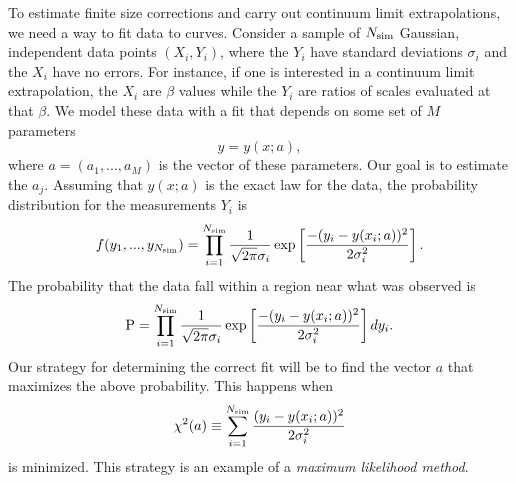To estimate finite size corrections and carry out continuum limit
extrapolations, we need a way to fit data to curves.
Consider a sample of $N_{\text{sim}}$ Gaussian, independent data points $(X_i,Y_i)$,
where the $Y_i$ have standard deviations $\sigma_i$ and the $X_i$ have
no errors. For instance, if one is interested in a continuum limit
extrapolation, the $X_i$ are $\beta$ values while the $Y_i$ are
ratios of scales evaluated at that $\beta$.
We model these data with a fit that depends on some set
of $M$ parameters
\begin{equation}
  y=y(x;a),
\end{equation}
where $a=(a_1,...,a_M)$ is the vector of these parameters. Our goal
is to estimate the $a_j$.
Assuming that $y(x;a)$ is the exact law for the data, the probability
distribution for the measurements $Y_i$ is 
\begin{equation}
  f(y_1,...,y_{N_{\text{sim}}})=\prod_{i=1}^{N_{\text{sim}}}\frac{1}{\sqrt{2\pi}\sigma_i}
      \exp\left[\frac{-(y_i-y(x_i;a))^2}{2\sigma_i^2}\right].
\end{equation}
The probability that the data fall within a region near what was observed is
\begin{equation}
  \text{P}=\prod_{i=1}^{N_{\text{sim}}}\frac{1}{\sqrt{2\pi}\sigma_i}
      \exp\left[\frac{-(y_i-y(x_i;a))^2}{2\sigma_i^2}\right]dy_i.
\end{equation}
Our strategy for determining the correct fit will be to find the vector $a$
that maximizes the above probability. This happens when
\begin{equation}
  \chi^2(a)\equiv\sum_{i=1}^{N_{\text{sim}}}\frac{(y_i-y(x_i;a))^2}{2\sigma_i^2}
\end{equation}
is minimized. This strategy is an example of a {\it maximum likelihood method}.

